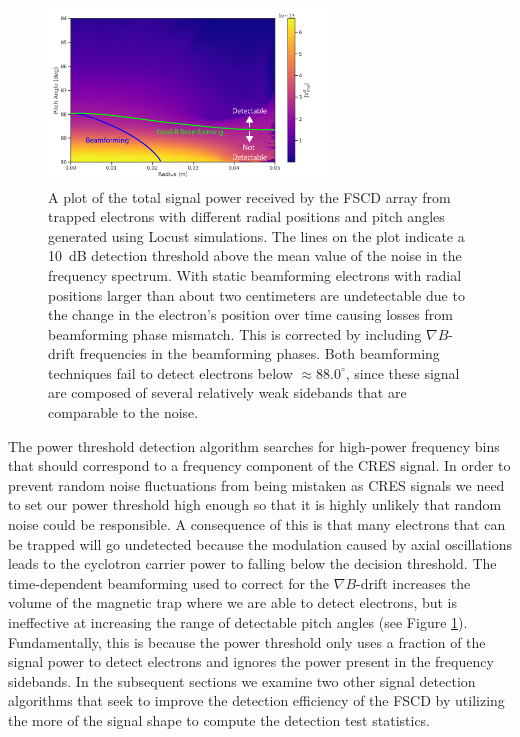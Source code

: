 \begin{figure}[htbp]
    \centering
    \includegraphics[width=0.67\textwidth]{figs/Chapter-4/230522_beamforming_detectability.png}
    \caption{A plot of the total signal power received by the FSCD array from trapped electrons with different radial positions and pitch angles generated using Locust simulations. The lines on the plot indicate a 10~dB detection threshold above the mean value of the noise in the frequency spectrum. With static beamforming electrons with radial positions larger than about two centimeters are undetectable due to the change in the electron's position over time causing losses from beamforming phase mismatch. This is corrected by including $\nabla B$-drift frequencies in the beamforming phases. Both beamforming techniques fail to detect electrons below $\approx 88.0^\circ$, since these signal are composed of several relatively weak sidebands that are comparable to the noise.}
    \label{fig:chap4-detection-boundaries}
\end{figure}

The power threshold detection algorithm searches for high-power frequency bins that should correspond to a frequency component of the CRES signal. In order to prevent random noise fluctuations from being mistaken as CRES signals we need to set our power threshold high enough so that it is highly unlikely that random noise could be responsible. A consequence of this is that many electrons that can be trapped will go undetected because the modulation caused by axial oscillations leads to the cyclotron carrier power to falling below the decision threshold. The time-dependent beamforming used to correct for the $\nabla B$-drift increases the volume of the magnetic trap where we are able to detect electrons, but is ineffective at increasing the range of detectable pitch angles (see Figure \ref{fig:chap4-detection-boundaries}). Fundamentally, this is because the power threshold only uses a fraction of the signal power to detect electrons and ignores the power present in the frequency sidebands. In the subsequent sections we examine two other signal detection algorithms that seek to improve the detection efficiency of the FSCD by utilizing the more of the signal shape to compute the detection test statistics.

